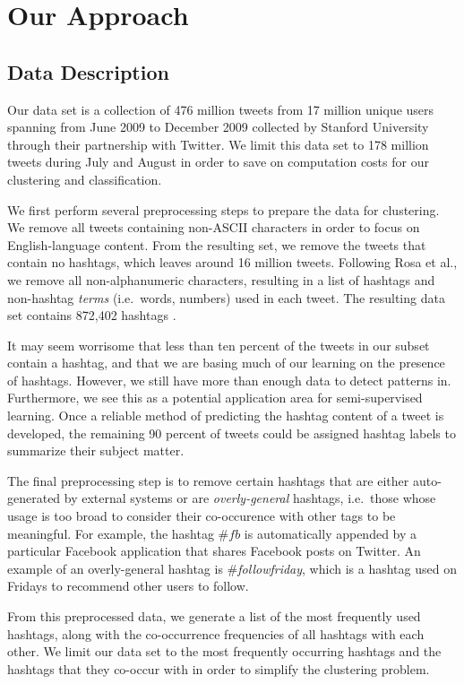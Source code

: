 

\section{Our Approach}
\subsection{Data Description}
Our data set is a collection of 476 million tweets from 17 million unique users spanning from June 2009 to December 2009 collected by Stanford University through their partnership with Twitter. We limit this data set to 178 million tweets during July and August in order to save on computation costs for our clustering and classification.

We first perform several preprocessing steps to prepare the data for clustering. We remove all tweets containing non-ASCII characters in order to focus on English-language content.  From the resulting set, we remove the tweets that contain no hashtags, which leaves around 16 million tweets. Following Rosa et al., we remove all non-alphanumeric characters, resulting in a list of hashtags and non-hashtag \emph{terms} (i.e.\ words, numbers) used in each tweet.  The resulting data set contains 872,402 hashtags \cite{Rosa2011}.

It may seem worrisome that less than ten percent of the tweets in our subset contain a hashtag, and that we are basing much of our learning on the presence of hashtags. However, we still have more than enough data to detect patterns in. Furthermore, we see this as a potential application area for semi-supervised learning. Once a reliable method of predicting the hashtag content of a tweet is developed, the remaining 90 percent of tweets could be assigned hashtag labels to summarize their subject matter.

The final preprocessing step is to remove certain hashtags that are either auto-generated by external systems or are \emph{overly-general} hashtags, i.e.\ those whose usage is too broad to consider their co-occurence with other tags to be meaningful. For example, the hashtag $\#fb$  is automatically appended by a particular Facebook application that shares Facebook posts on Twitter. An example of an overly-general hashtag is \emph{$\#$followfriday}, which is a hashtag used on Fridays to recommend other users to follow.

From this preprocessed data, we generate a list of the most frequently used hashtags, along with the co-occurrence frequencies of all hashtags with each other. We limit our data set to the most frequently occurring hashtags and the hashtags that they co-occur with in order to simplify the clustering problem.

